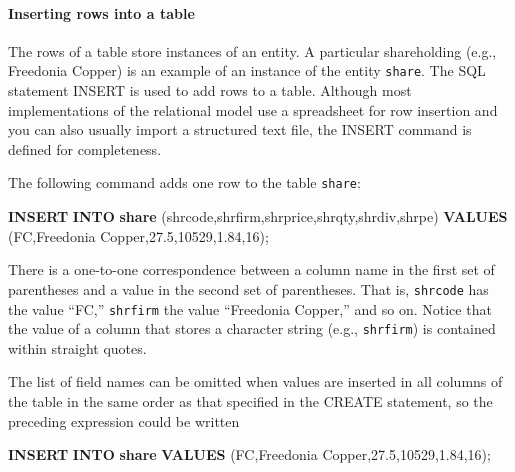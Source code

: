 \documentclass[
]{article}
\newenvironment{Shaded}{\begin{snugshade}}{\end{snugshade}}
\newcommand{\DecValTok}[1]{\textcolor[rgb]{0.00,0.00,0.81}{#1}}
\newcommand{\FloatTok}[1]{\textcolor[rgb]{0.00,0.00,0.81}{#1}}
\newcommand{\KeywordTok}[1]{\textcolor[rgb]{0.13,0.29,0.53}{\textbf{#1}}}
\newcommand{\NormalTok}[1]{#1}
\newcommand{\StringTok}[1]{\textcolor[rgb]{0.31,0.60,0.02}{#1}}
\begin{document}
\hypertarget{inserting-rows-into-a-table}{%
\paragraph*{Inserting rows into a table}\label{inserting-rows-into-a-table}}

The rows of a table store instances of an entity. A particular shareholding (e.g., Freedonia Copper) is an example of an instance of the entity \texttt{share}. The SQL statement INSERT is used to add rows to a table. Although most implementations of the relational model use a spreadsheet for row insertion and you can also usually import a structured text file, the INSERT command is defined for completeness.

The following command adds one row to the table \texttt{share}:

\begin{Shaded}
\begin{Highlighting}[]
\KeywordTok{INSERT} \KeywordTok{INTO} \KeywordTok{share}
\NormalTok{  (shrcode,shrfirm,shrprice,shrqty,shrdiv,shrpe)}
  \KeywordTok{VALUES}\NormalTok{ (}\StringTok{\textquotesingle{}FC\textquotesingle{}}\NormalTok{,}\StringTok{\textquotesingle{}Freedonia Copper\textquotesingle{}}\NormalTok{,}\FloatTok{27.5}\NormalTok{,}\DecValTok{10529}\NormalTok{,}\FloatTok{1.84}\NormalTok{,}\DecValTok{16}\NormalTok{);}
\end{Highlighting}
\end{Shaded}

There is a one-to-one correspondence between a column name in the first set of parentheses and a value in the second set of parentheses. That is, \texttt{shrcode} has the value ``FC,'' \texttt{shrfirm} the value ``Freedonia Copper,'' and so on. Notice that the value of a column that stores a character string (e.g., \texttt{shrfirm}) is contained within straight quotes.

The list of field names can be omitted when values are inserted in all columns of the table in the same order as that specified in the CREATE statement, so the preceding expression could be written

\begin{Shaded}
\begin{Highlighting}[]
\KeywordTok{INSERT} \KeywordTok{INTO} \KeywordTok{share}
  \KeywordTok{VALUES}\NormalTok{ (}\StringTok{\textquotesingle{}FC\textquotesingle{}}\NormalTok{,}\StringTok{\textquotesingle{}Freedonia Copper\textquotesingle{}}\NormalTok{,}\FloatTok{27.5}\NormalTok{,}\DecValTok{10529}\NormalTok{,}\FloatTok{1.84}\NormalTok{,}\DecValTok{16}\NormalTok{);}
\end{Highlighting}
\end{Shaded}
\end{document}
